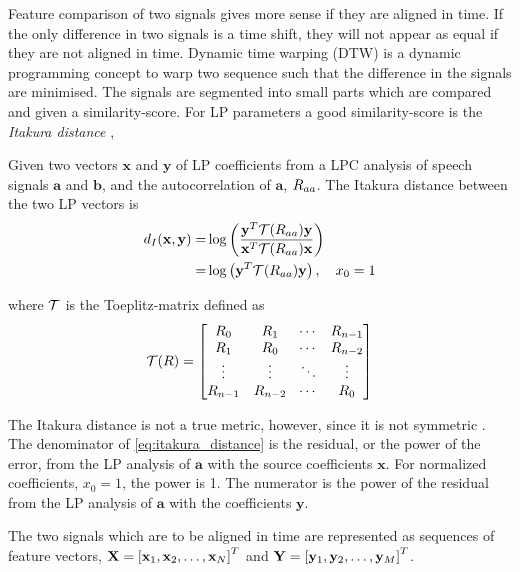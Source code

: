 Feature comparison of two signals gives more sense if they are aligned in time. If the only difference in two signals is a time shift, they will not appear as equal if they are not aligned in time. Dynamic time warping (DTW) is a dynamic programming concept to warp two sequence such that the difference in the signals are minimised. The signals are segmented into small parts which are compared and given a similarity-score. For LP parameters a good similarity-score is the \emph{Itakura distance} \cite{itakura75min},
\newcommand{\ita}{d_{I}}
\begin{definition}
	Given two vectors $\mathbf{x}$ and $\mathbf{y}$ of LP coefficients from a LPC analysis of speech signals $\mathbf{a}$ and $\mathbf{b}$, and the autocorrelation of $\mathbf{a}$, $R_{aa}$. The Itakura distance between the two LP vectors is
	\begin{equation}
		\label{eq:itakura_distance}
		\begin{split}
			\ita(\mathbf{x},\mathbf{y}) = & \log\pbrackets{\frac{\mathbf{y}^T \ttt(\auto_{aa}) \mathbf{y}}{\mathbf{x}^T \ttt(\auto_{aa}) \mathbf{x}}} \\
			 = & \log\pbrackets{\mathbf{y}^T \ttt(\auto_{aa}) \mathbf{y}}, \quad x_0 = 1
		\end{split}
	\end{equation}
\end{definition}
where $\mathcal T$ is the Toeplitz-matrix defined as 
\begin{equation}
	\label{eq:toeplitz}
	\mathcal T(R) = 
	\begin{bmatrix}
		R_0 & R_1 & \dotsi & R_{n-1} 	\\
		R_1 & R_0 & \dotsi & R_{n-2} \\
		\vdots & \vdots & \ddots & \vdots \\
		R_{n-1} & R_{n-2} & \dotsi & R_{0}
	\end{bmatrix}
\end{equation}	

The Itakura distance is not a true metric, however, since it is not symmetric \cite{kreyszig89}. The denominator of \eqref{eq:itakura_distance} is the residual, or the power of the error, from the LP analysis of $\mathbf{a}$ with the source coefficients $\mathbf{x}$. For normalized coefficients, $x_0 = 1$, the power is 1. The numerator is the power of the residual from the LP analysis of $\mathbf{a}$ with the coefficients $\mathbf{y}$. 

The two signals which are to be aligned in time are represented as sequences of feature vectors, $\mathbf{X}=\left[\mathbf{x}_1,\mathbf{x}_2,\dotsc,\mathbf{x}_N\right]^T$ and $\mathbf{Y}=\left[\mathbf{y}_1,\mathbf{y}_2,\dotsc,\mathbf{y}_M\right]^T$. 

